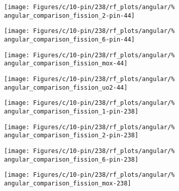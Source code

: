 \begin{figure*}[tbph]
    \centering
    \texttt{[image: Figures/c/10-pin/238/rf\_plots/angular/\%
        angular\_comparison\_fission\_2-pin-44]}
\end{figure*}

\begin{figure*}[tbph]
    \centering
    \texttt{[image: Figures/c/10-pin/238/rf\_plots/angular/\%
        angular\_comparison\_fission\_6-pin-44]}
\end{figure*}

\begin{figure*}[tbph]
    \centering
    \texttt{[image: Figures/c/10-pin/238/rf\_plots/angular/\%
        angular\_comparison\_fission\_mox-44]}
\end{figure*}

\begin{figure*}[tbph]
    \centering
    \texttt{[image: Figures/c/10-pin/238/rf\_plots/angular/\%
        angular\_comparison\_fission\_uo2-44]}
\end{figure*}

\clearpage

\begin{figure*}[tbph]
    \centering
    \texttt{[image: Figures/c/10-pin/238/rf\_plots/angular/\%
        angular\_comparison\_fission\_1-pin-238]}
\end{figure*}

\begin{figure*}[tbph]
    \centering
    \texttt{[image: Figures/c/10-pin/238/rf\_plots/angular/\%
        angular\_comparison\_fission\_2-pin-238]}
\end{figure*}

\begin{figure*}[tbph]
    \centering
    \texttt{[image: Figures/c/10-pin/238/rf\_plots/angular/\%
        angular\_comparison\_fission\_6-pin-238]}
\end{figure*}

\begin{figure*}[tbph]
    \centering
    \texttt{[image: Figures/c/10-pin/238/rf\_plots/angular/\%
        angular\_comparison\_fission\_mox-238]}
\end{figure*}

